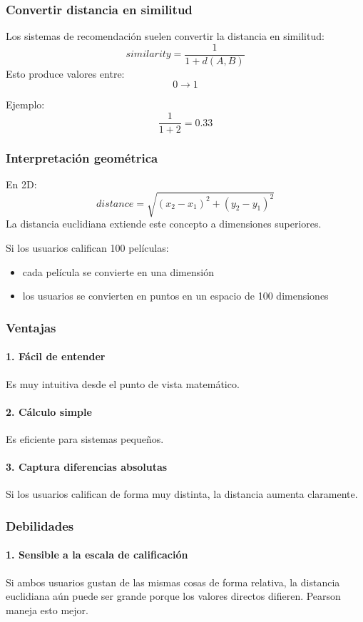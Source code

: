 \documentclass[12pt]{article}
\begin{document}
\subsubsection*{Convertir distancia en similitud}
Los sistemas de recomendación suelen convertir la distancia en similitud:
\[
similarity=\frac{1}{1+d(A,B)}
\]
Esto produce valores entre:
\[
0 \rightarrow 1
\]

Ejemplo:
\[
\frac{1}{1+2}=0.33
\]

\subsubsection*{Interpretación geométrica}
En 2D:
\[
distance = \sqrt{(x_2-x_1)^2+(y_2-y_1)^2}
\]
La distancia euclidiana extiende este concepto a dimensiones superiores.

Si los usuarios califican 100 películas:
\begin{itemize}
\item cada película se convierte en una dimensión
\item los usuarios se convierten en puntos en un espacio de 100 dimensiones
\end{itemize}

\subsubsection*{Ventajas}
\paragraph{1. Fácil de entender} Es muy intuitiva desde el punto de vista matemático.

\paragraph{2. Cálculo simple} Es eficiente para sistemas pequeños.

\paragraph{3. Captura diferencias absolutas} Si los usuarios califican de forma muy distinta, la distancia aumenta claramente.

\subsubsection*{Debilidades}
\paragraph{1. Sensible a la escala de calificación} Si ambos usuarios gustan de las mismas cosas de forma relativa, la distancia euclidiana aún puede ser grande porque los valores directos difieren. Pearson maneja esto mejor.
\end{document}
